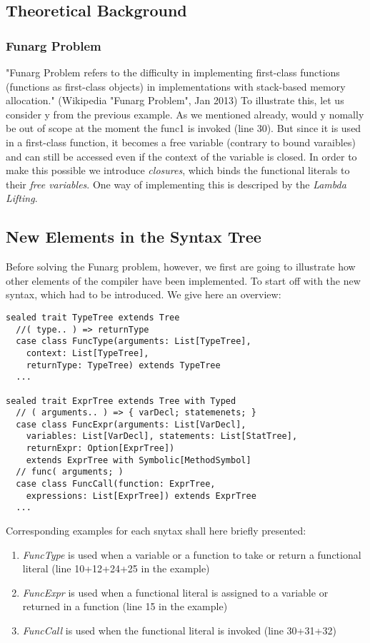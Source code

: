 \subsection{Theoretical Background}

\subsubsection{Funarg Problem}
"Funarg Problem refers to the difficulty in implementing first-class functions (functions as first-class objects) in implementations with stack-based memory allocation." (Wikipedia "Funarg Problem", Jan 2013) To illustrate this, let us consider y from the previous example. As we mentioned already, would y nomally be out of scope at the moment the func1 is invoked (line 30). But since it is used in a first-class function, it becomes a free variable (contrary to bound varaibles) and can still be accessed even if the context of the variable is closed. In order to make this possible we introduce \emph{closures}, which binds the functional literals to their \emph{free variables}. One way of implementing this is descriped by the \emph{Lambda Lifting}. \newline

\subsection{New Elements in the Syntax Tree}
Before solving the Funarg problem, however, we first are going to illustrate how other elements of the compiler have been implemented. To start off with the new syntax, which had to be introduced. We give here an overview:

\begin{lstlisting}
sealed trait TypeTree extends Tree
  //( type.. ) => returnType
  case class FuncType(arguments: List[TypeTree],
    context: List[TypeTree], 
    returnType: TypeTree) extends TypeTree
  ...

sealed trait ExprTree extends Tree with Typed
  // ( arguments.. ) => { varDecl; statemenets; }
  case class FuncExpr(arguments: List[VarDecl],
    variables: List[VarDecl], statements: List[StatTree],
    returnExpr: Option[ExprTree])
    extends ExprTree with Symbolic[MethodSymbol]
  // func( arguments; )
  case class FuncCall(function: ExprTree,
    expressions: List[ExprTree]) extends ExprTree
  ...
\end{lstlisting}

Corresponding examples for each snytax shall here briefly presented:
\begin{enumerate}
\item \emph{FuncType} is used when a variable or a function to take or return a functional literal (line 10+12+24+25 in the example)
\item \emph{FuncExpr} is used when a functional literal is assigned to a variable or returned in a function (line 15 in the example)
\item \emph{FuncCall} is used when the functional literal is invoked (line 30+31+32)
\end{enumerate}

